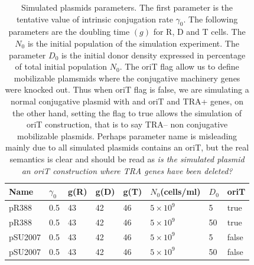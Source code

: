 \begin{table}
\centering
\begin{tabular}{llllllll}
\toprule
Name 	& $\gamma_0$ & g(R) & g(D) & g(T) &  $N_0$(cells/ml) & $D_0$ & oriT \\
\midrule 
pR388 	& 0.5 & 43 & 42 & 46 & $5\times10^9$ & 5 & true \\ 
pR388 	& 0.5 & 43 & 42 & 46 & $5\times10^9$ & 50 & true \\ 
pSU2007 & 0.5 & 43 & 42 & 46 & $5\times10^9$ & 5 & false \\ 
pSU2007 & 0.5 & 43 & 42 & 46 & $5\times10^9$ & 50 & false \\ 
\bottomrule
\end{tabular}
\caption[Simulated plasmids]{\label{tbl:plasmids} Simulated plasmids parameters. The first parameter is the tentative value of intrinsic conjugation rate $\gamma_0$.  The following parameters are the doubling time $(g)$ for R, D and T cells. The $N_0$ is the initial population of the simulation experiment. The parameter $D_0$ is the initial donor density expressed in percentage of total initial population $N_0$. The oriT flag allow us to define mobilizable plamsmids where the conjugative machinery genes were knocked out. Thus when oriT flag is false, we are simulating a normal conjugative plasmid with and oriT and TRA+ genes, on the other hand, setting the flag to true allows the simulation of oriT construction, that is to say TRA-- non conjugative mobilizable plasmids. Perhaps parameter name is misleading mainly due to all simulated plasmids contains an oriT, but the real semantics is clear and should be read as {\it is the simulated plasmid an oriT construction where TRA genes have been deleted?}} 
\end{table}


